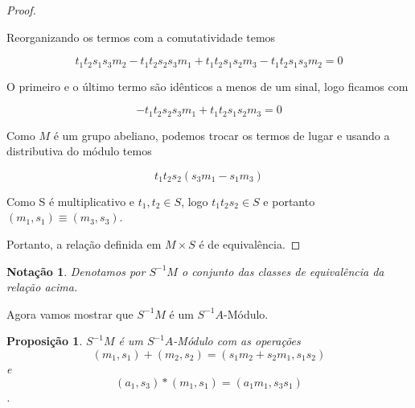 \documentclass[10pt,a4paper]{article}
\newtheorem{proposition}[theorem]{Proposição}
\newtheorem{notation}[theorem]{Notação}
\begin{document}
\begin{proof}
\begin{enumerate}
		Reorganizando os termos com a comutatividade temos
		
		$$t_1t_2s_1s_3m_2-t_1t_2s_2s_3m_1+t_1t_2s_1s_2m_3-t_1t_2s_1s_3m_2=0$$
		
		O primeiro e o último termo são idênticos a menos de um sinal, logo ficamos com 
		
		$$-t_1t_2s_2s_3m_1+t_1t_2s_1s_2m_3=0$$
		
		Como $M$ é um grupo abeliano, podemos trocar os termos de lugar e usando a distributiva do módulo temos 
		
		$$t_1t_2s_2(s_3m_1-s_1m_3)$$
		
		Como S é multiplicativo e $t_1, t_2 \in S$, logo $t_1t_2s_2 \in S$ e portanto $(m_1,s_1) \equiv (m_3, s_3)$.
	\end{enumerate}
	
	Portanto, a relação definida em $M \times S$ é de equivalência.
	
\end{proof}

\begin{notation}
	Denotamos por $S^{-1}M$ o conjunto das classes de equivalência da relação acima.
\end{notation}

Agora vamos mostrar que $S^{-1}M$ é um $S^{-1}A$-Módulo.

\begin{proposition}
	$S^{-1}M$ é um $S^{-1}A$-Módulo com as operações $$(m_1,s_1)+(m_2,s_2)=(s_1m_2+s_2m_1,s_1s_2)$$ e $$(a_1,s_3)*(m_1,s_1)=(a_1m_1,s_3s_1)$$.
\end{proposition}
\end{document}

